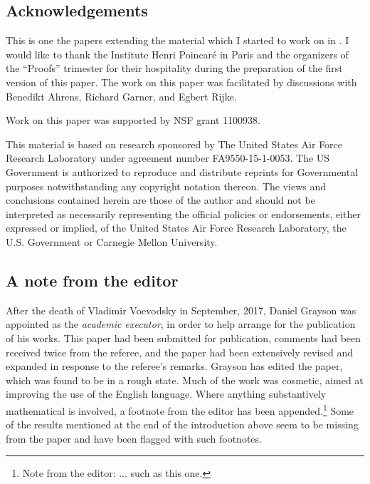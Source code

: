 \documentclass[onecolumn,12pt]{amsart}
\numberwithin{proposition}{subsection}
\newcommand{\editorfootnote}[1]{\footnote{Note from the editor: #1}}
\begin{document}
\subsection{Acknowledgements}

This is one the papers extending the material which I started to work on in
\cite{NTS}. I would like to thank the Institute Henri Poincar\'e in Paris and the
organizers of the ``Proofs'' trimester for their hospitality during the
preparation of the first version of this paper. The work on this paper was
facilitated by discussions with Benedikt Ahrens, Richard Garner, and Egbert
Rijke.

Work on this paper was supported by NSF grant 1100938.

This material is based on research sponsored by The United States Air
  Force Research Laboratory under agreement number FA9550-15-1-0053. The US
  Government is authorized to reproduce and distribute reprints for
  Governmental purposes notwithstanding any copyright notation thereon.
The views and conclusions contained herein are those of the author and should
not be interpreted as necessarily representing the official policies or
endorsements, either expressed or implied, of the United States Air Force
Research Laboratory, the U.S. Government or Carnegie Mellon University.

\subsection{A note from the editor}

After the death of Vladimir Voevodsky in
September, 2017, Daniel Grayson was appointed as the {\em academic executor},
in order to help arrange for the publication of his works.  This paper had been
submitted for publication, comments had been received twice from the referee,
and the paper had been extensively revised and expanded in response to the
referee's remarks.  Grayson has edited the paper, which was found
to be in a rough state.  Much of the work was cosmetic, aimed at improving the
use of the English language.  Where anything substantively mathematical is
involved, a footnote from the editor has been appended.\editorfootnote{... such
  as this one.}  Some of the results mentioned at the end of the introduction above
seem to be missing from the paper and have been flagged with such footnotes.
\end{document}
